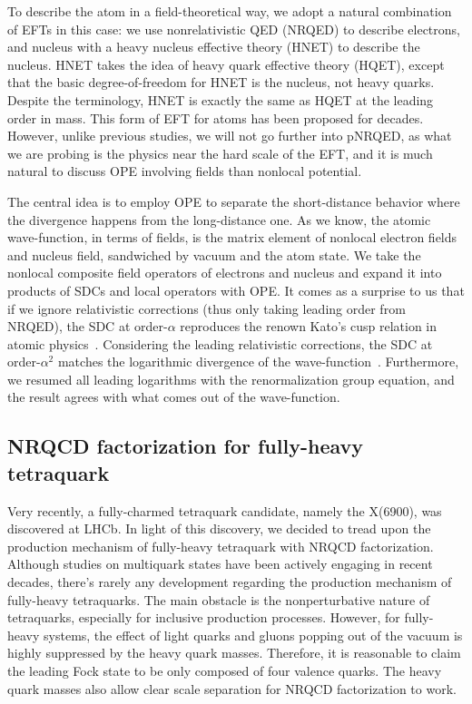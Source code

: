 \documentclass[letterpaper,11pt]{article}
\begin{document}
    To describe the atom in a field-theoretical way, we adopt a natural combination of EFTs in this case: we use nonrelativistic QED (NRQED) to describe electrons, and nucleus with a heavy nucleus effective theory (HNET) to describe the nucleus. HNET takes the idea of heavy quark effective theory (HQET), except that the basic degree-of-freedom for HNET is the nucleus, not heavy quarks. Despite the terminology, HNET is exactly the same as HQET at the leading order in mass. This form of EFT for atoms has been proposed for decades. However, unlike previous studies, we will not go further into pNRQED, as what we are probing is the physics near the hard scale of the EFT, and it is much natural to discuss OPE involving fields than nonlocal potential. 

    The central idea is to employ OPE to separate the short-distance behavior where the divergence happens from the long-distance one. As we know, the atomic wave-function, in terms of fields, is the matrix element of nonlocal electron fields and nucleus field, sandwiched by vacuum and the atom state. We take the nonlocal composite field operators of electrons and nucleus and expand it into products of SDCs and local operators with OPE. It comes as a surprise to us that if we ignore relativistic corrections (thus only taking leading order from NRQED), the SDC at order-$\alpha$ reproduces the renown Kato's cusp relation in atomic physics~\cite{Huang2018}. Considering the leading relativistic corrections, the SDC at order-$\alpha^2$ matches the logarithmic divergence of the wave-function~\cite{Huang2018a,Huang2019}. Furthermore, we resumed all leading logarithms with the renormalization group equation, and the result agrees with what comes out of the wave-function. 

	\subsection*{NRQCD factorization for fully-heavy tetraquark}
	Very recently, a fully-charmed tetraquark candidate, namely the X(6900),  was discovered at LHCb. In light of this discovery, we decided to tread upon the production mechanism of fully-heavy tetraquark with NRQCD factorization. Although studies on multiquark states have been actively engaging in recent decades, there's rarely any development regarding the production mechanism of fully-heavy tetraquarks. The main obstacle is the nonperturbative nature of tetraquarks, especially for inclusive production processes. However, for fully-heavy systems, the effect of light quarks and gluons popping out of the vacuum is highly suppressed by the heavy quark masses. Therefore, it is reasonable to claim the leading Fock state to be only composed of four valence quarks. The heavy quark masses also allow clear scale separation for NRQCD factorization to work. 
\end{document}
